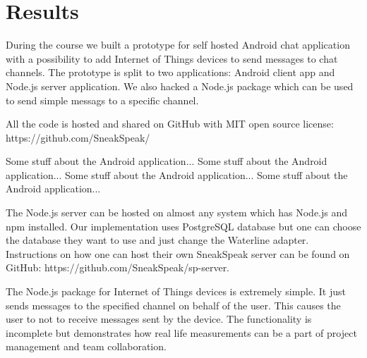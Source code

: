 \section{Results}
During the course we built a prototype for self hosted Android chat application with a possibility to add Internet of Things devices to send messages to chat channels. The prototype is split to two applications: Android client app and Node.js server application. We also hacked a Node.js package which can be used to send simple messags to a specific channel.

All the code is hosted and shared on GitHub with MIT open source license: https://github.com/SneakSpeak/

Some stuff about the Android application... Some stuff about the Android application... Some stuff about the Android application... Some stuff about the Android application...

The Node.js server can be hosted on almost any system which has Node.js and npm installed. Our implementation uses PostgreSQL database but one can choose the database they want to use and just change the Waterline adapter. Instructions on how one can host their own SneakSpeak server can be found on GitHub: https://github.com/SneakSpeak/sp-server.

The Node.js package for Internet of Things devices is extremely simple. It just sends messages to the specified channel on behalf of the user. This causes the user to not to receive messages sent by the device. The functionality is incomplete but demonstrates how real life measurements can be a part of project management and team collaboration. 
